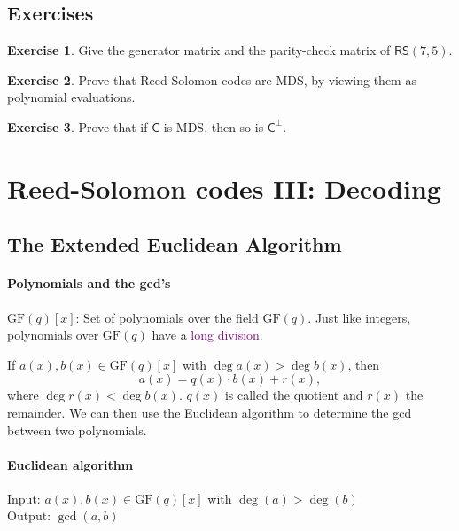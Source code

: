 \documentclass[a4paper, 11pt, openany]{book}
\numberwithin{equation}{section}
\theoremstyle{plain}
\theoremstyle{definition}
\newtheorem{exercise}   {Exercise}  [section]
\newcommand{\GF}{\mathrm{GF}}
\newcommand{\Define}[1]{\textcolor{purple}{#1}}
\newcommand{\code}[1]{\mathsf{#1}}
\newcommand{\ReedSolomon}           {\code{RS}}
\begin{document}
\subsection{Exercises}

\begin{exercise}
Give the generator matrix and the parity-check matrix of $\ReedSolomon(7,5)$.
\end{exercise}



\begin{exercise} \label{q:RS_MDS}
Prove that Reed-Solomon codes are MDS, by viewing them as polynomial evaluations.
\end{exercise}



\begin{exercise} \label{q:MDS}
Prove that if $\code{C}$ is MDS, then so is $\code{C}^\perp$.
\end{exercise}












\section{Reed-Solomon codes III: Decoding}
\label{sec:28}




\subsection{The Extended Euclidean Algorithm}





\paragraph{Polynomials and the gcd's}
$\GF(q)[x]$: Set of polynomials over the field $\GF(q)$. Just like integers, polynomials over $\GF(q)$ have a \Define{long division}.

If $a(x), b(x) \in \GF(q)[x]$ with $\deg a(x) > \deg b(x)$, then 
\[
	a(x) = q(x) \cdot b(x) + r(x),
\]
where $\deg r(x) < \deg b(x)$. $q(x)$ is called the quotient and $r(x)$ the remainder. We can then use the Euclidean algorithm to determine the gcd between two polynomials.



\paragraph{Euclidean algorithm}
Input: $a(x), b(x) \in \GF(q)[x]$ with $\deg(a) > \deg(b)$\\
Output: $\gcd(a,b)$
\end{document}
